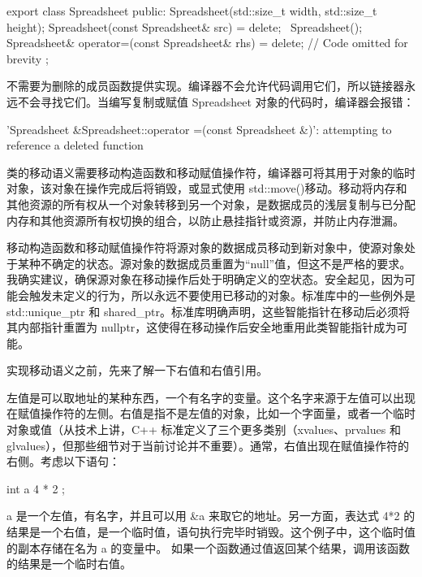 \begin{cpp}
export class Spreadsheet
{
    public:
        Spreadsheet(std::size_t width, std::size_t height);
        Spreadsheet(const Spreadsheet& src) = delete;
        ~Spreadsheet();
        Spreadsheet& operator=(const Spreadsheet& rhs) = delete;
        // Code omitted for brevity
};
\end{cpp}

不需要为删除的成员函数提供实现。编译器不会允许代码调用它们，所以链接器永远不会寻找它们。当编写复制或赋值 Spreadsheet 对象的代码时，编译器会报错：

\begin{shell}
'Spreadsheet &Spreadsheet::operator =(const Spreadsheet &)': attempting to
reference a deleted function
\end{shell}


类的移动语义需要移动构造函数和移动赋值操作符，编译器可将其用于对象的临时对象，该对象在操作完成后将销毁，或显式使用 std::move()移动。移动将内存和其他资源的所有权从一个对象转移到另一个对象，是数据成员的浅层复制与已分配内存和其他资源所有权切换的组合，以防止悬挂指针或资源，并防止内存泄漏。

移动构造函数和移动赋值操作符将源对象的数据成员移动到新对象中，使源对象处于某种不确定的状态。源对象的数据成员重置为“null”值，但这不是严格的要求。我确实建议，确保源对象在移动操作后处于明确定义的空状态。安全起见，因为可能会触发未定义的行为，所以永远不要使用已移动的对象。标准库中的一些例外是 std::unique\_ptr 和 shared\_ptr。标准库明确声明，这些智能指针在移动后必须将其内部指针重置为 nullptr，这使得在移动操作后安全地重用此类智能指针成为可能。

实现移动语义之前，先来了解一下右值和右值引用。


左值是可以取地址的某种东西，一个有名字的变量。这个名字来源于左值可以出现在赋值操作符的左侧。右值是指不是左值的对象，比如一个字面量，或者一个临时对象或值（从技术上讲，C++ 标准定义了三个更多类别（xvalues、prvalues 和 glvalues），但那些细节对于当前讨论并不重要）。通常，右值出现在赋值操作符的右侧。考虑以下语句：

\begin{cpp}
int a { 4 * 2 };
\end{cpp}

a 是一个左值，有名字，并且可以用 \&a 来取它的地址。另一方面，表达式 4*2 的结果是一个右值，是一个临时值，语句执行完毕时销毁。这个例子中，这个临时值的副本存储在名为 a 的变量中。 如果一个函数通过值返回某个结果，调用该函数的结果是一个临时右值。

